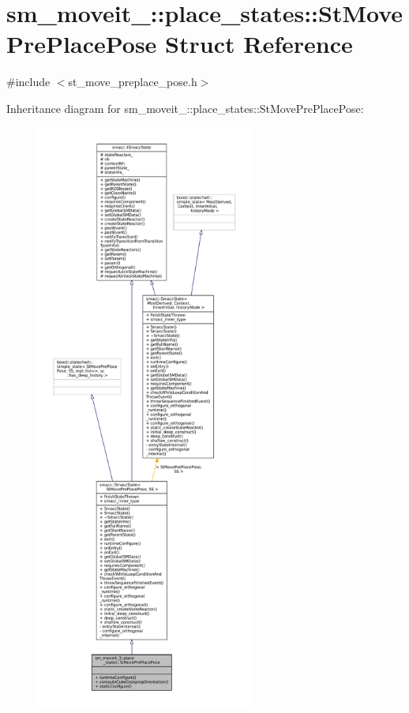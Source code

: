 \hypertarget{structsm__moveit__3_1_1place__states_1_1StMovePrePlacePose}{}\section{sm\+\_\+moveit\+\_\+:\+:place\+\_\+states\+:\+:St\+Move\+Pre\+Place\+Pose Struct Reference}
\label{structsm__moveit__3_1_1place__states_1_1StMovePrePlacePose}


{\ttfamily \#include $<$st\+\_\+move\+\_\+preplace\+\_\+pose.\+h$>$}



Inheritance diagram for sm\+\_\+moveit\+\_\+:\+:place\+\_\+states\+:\+:St\+Move\+Pre\+Place\+Pose\+:
\nopagebreak
\begin{figure}[H]
\begin{center}
\leavevmode
\includegraphics[height=550pt]{structsm__moveit__3_1_1place__states_1_1StMovePrePlacePose__inherit__graph}
\end{center}
\end{figure}


